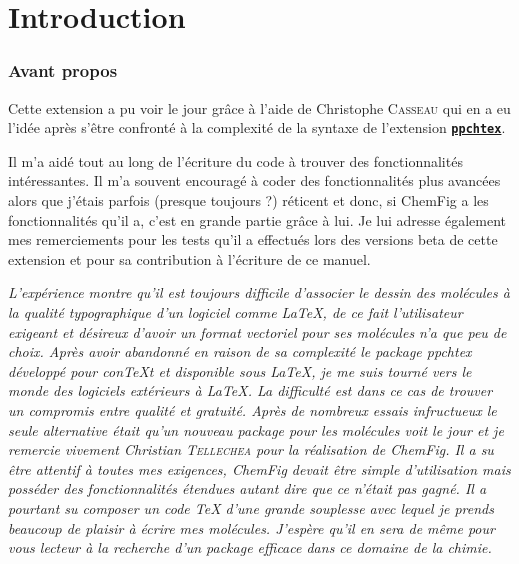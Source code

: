 \documentclass[10pt]{article}
\newcommand\CF{{\ECFAugie ChemFig}\xspace}
\begin{document}
\parindent0pt\pagestyle{plain}
\tableofcontents
\parskip\medskipamount
\vspace{2cm}

\part{Introduction}
\section{Avant propos}
Cette extension a pu voir le jour grâce à l'aide de Christophe \textsc{Casseau} qui en a eu l'idée après s'être confronté à la complexité de la syntaxe de l'extension \href{http://www.ctan.org/tex-archive/help/Catalogue/entries/ppchtex.html}{\texttt{\textbf{ppchtex}}}.

Il m'a aidé tout au long de l'écriture du code à trouver des fonctionnalités intéressantes. Il m'a souvent encouragé à coder des fonctionnalités plus avancées alors que j'étais parfois (presque toujours ?) réticent et donc, si \CF a les fonctionnalités qu'il a, c'est en grande partie grâce à lui. Je lui adresse également mes remerciements pour les tests qu'il a effectués lors des versions beta de cette extension et pour sa contribution à l'écriture de ce manuel.\medskip

\begingroup
{}\linewidth
{}\linewidth
\itshape\small
L'expérience montre qu'il est toujours difficile d'associer le dessin des molécules à la qualité typographique d'un logiciel comme \LaTeX, de ce fait l'utilisateur exigeant et désireux d'avoir un format vectoriel pour ses molécules n'a que peu de choix. Après avoir abandonné en raison de sa complexité le package \emph{ppchtex} développé pour con\TeX t et disponible sous \LaTeX, je me suis tourné vers le monde des logiciels extérieurs à \LaTeX. La difficulté est dans ce cas de trouver un compromis entre qualité et gratuité. Après de nombreux essais infructueux le seule alternative était qu'un nouveau package pour les molécules voit le jour et je remercie vivement Christian \textsc{Tellechea} pour la réalisation de \CF. Il a su être attentif à toutes mes exigences, \CF devait être simple d'utilisation mais posséder des fonctionnalités étendues autant dire que ce n'était pas gagné. Il a pourtant su composer un code \TeX{} d'une grande souplesse avec lequel je prends beaucoup de plaisir à écrire mes molécules. J'espère qu'il en sera de même pour vous lecteur à la recherche d'un package efficace dans ce domaine de la chimie.\smallskip
\end{document}
